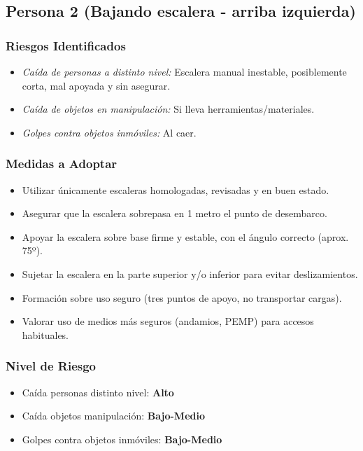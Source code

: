 \documentclass[12pt,a4paper]{article}
\begin{document}
	\bigskip\hrulefill\bigskip
	
	\subsection{Persona 2 (Bajando escalera - arriba izquierda)}
	
	\subsubsection{Riesgos Identificados}
	\begin{itemize}
		\item \textit{Caída de personas a distinto nivel:} Escalera manual inestable, posiblemente corta, mal apoyada y sin asegurar.
		\item \textit{Caída de objetos en manipulación:} Si lleva herramientas/materiales.
		\item \textit{Golpes contra objetos inmóviles:} Al caer.
	\end{itemize}
	
	\subsubsection{Medidas a Adoptar}
	\begin{itemize}
		\item Utilizar únicamente escaleras homologadas, revisadas y en buen estado.
		\item Asegurar que la escalera sobrepasa en 1 metro el punto de desembarco.
		\item Apoyar la escalera sobre base firme y estable, con el ángulo correcto (aprox. 75º).
		\item Sujetar la escalera en la parte superior y/o inferior para evitar deslizamientos.
		\item Formación sobre uso seguro (tres puntos de apoyo, no transportar cargas).
		\item Valorar uso de medios más seguros (andamios, PEMP) para accesos habituales.
	\end{itemize}
	
	\subsubsection{Nivel de Riesgo}
	\begin{itemize}
		\item Caída personas distinto nivel: \textbf{Alto}
		\item Caída objetos manipulación: \textbf{Bajo-Medio}
		\item Golpes contra objetos inmóviles: \textbf{Bajo-Medio}
	\end{itemize}
	
\end{document}
